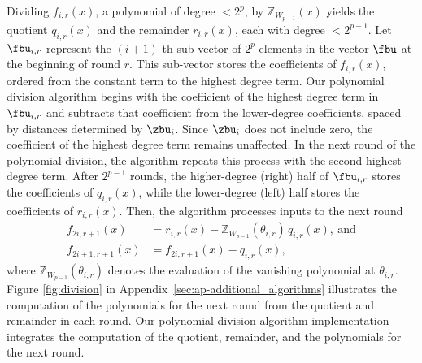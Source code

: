 Dividing \( f_{i,r}(x) \), a polynomial of degree $< 2^p$, by \( \mathbb{Z}_{W_{p-1}}(x) \) yields the quotient \( q_{i,r}(x) \) and the remainder \( r_{i,r}(x) \), each with degree $< 2^{p-1}$. Let $\fbu_{i,r}$ represent the $(i+1)$-th sub-vector of $2^p$ elements in the vector $\fbu$ at the beginning of round $r$. This sub-vector stores the coefficients of \( f_{i,r}(x) \), ordered from the constant term to the highest degree term. Our polynomial division algorithm begins with the coefficient of the highest degree term in $\fbu_{i,r}$ and subtracts that coefficient from the lower-degree coefficients, spaced by distances determined by $\zbu_i$. Since $\zbu_i$ does not include zero, the coefficient of the highest degree term remains unaffected. In the next round of the polynomial division, the algorithm repeats this process with the second highest degree term. After $2^{p-1}$ rounds, the higher-degree (right) half of $\fbu_{i,r}$ stores the coefficients of \( q_{i,r}(x) \), while the lower-degree (left) half stores the coefficients of \( r_{i,r}(x) \). Then, 
the algorithm processes inputs to the next round 
\begin{align*}
	f_{2i,r+1}(x) &= r_{i,r}(x) - \mathbb{Z}_{W_{p-1}}(\theta_{i,r})\, q_{i,r}(x),\ \text{and}\\
	f_{2i+1,r+1}(x) &= f_{2i,r+1}(x) - q_{i,r}(x),
\end{align*}
where $\mathbb{Z}_{W_{p-1}}(\theta_{i,r})$ denotes the evaluation of the vanishing polynomial at $\theta_{i,r}$. Figure \ref{fig:division} in Appendix~\ref{sec:ap-additional_algorithms} illustrates the computation of the polynomials for the next round from the quotient and remainder in each round. Our polynomial division algorithm implementation integrates the computation of the quotient, remainder, and the polynomials for the next round. 

